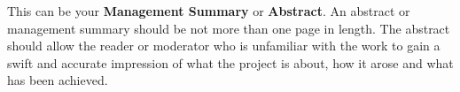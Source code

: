 
This can be your \textbf{Management Summary} or \textbf{Abstract}. An abstract or management summary should be not more than one page in length. The abstract should allow the reader or moderator who is unfamiliar with the work to gain a swift and accurate impression of what the project is about, how it arose and what has been achieved. 